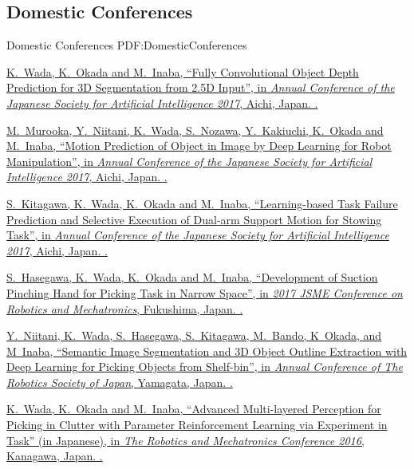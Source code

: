 \documentclass[letterpaper,MMMyyyy,nonstop]{simpleresumecv}
\begin{document}
\begin{body}
\BigGap
\subsection
{Domestic Conferences}
{Domestic Conferences}
{PDF:DomesticConferences}

\GapNoBreak
\NumberedItem{{\CharSpace}[10]}
\href{https://www.ai-gakkai.or.jp/jsai2017}
{\underline{K.~Wada}, K.~Okada and M.~Inaba,
``Fully Convolutional Object Depth Prediction for 3D Segmentation from 2.5D Input'',
in \textit{Annual Conference of the Japanese Society for Artificial Intelligence 2017},
Aichi, Japan.
.}

\GapNoBreak
\NumberedItem{{\CharSpace}[11]}
\href{https://www.ai-gakkai.or.jp/jsai2017}
{M.~Murooka, Y.~Niitani, \underline{K.~Wada}, S.~Nozawa, Y.~Kakiuchi, K.~Okada and M.~Inaba,
``Motion Prediction of Object in Image by Deep Learning for Robot Manipulation'',
in \textit{Annual Conference of the Japanese Society for Artificial Intelligence 2017},
Aichi, Japan.
.}

\GapNoBreak
\NumberedItem{{\CharSpace}[12]}
\href{https://www.ai-gakkai.or.jp/jsai2017}
{S.~Kitagawa, \underline{K.~Wada}, K.~Okada and M.~Inaba,
``Learning-based Task Failure Prediction and Selective Execution of Dual-arm Support Motion for Stowing Task'',
in \textit{Annual Conference of the Japanese Society for Artificial Intelligence 2017},
Aichi, Japan.
.}

\GapNoBreak
\NumberedItem{{\CharSpace}[13]}
\href{http://robomech.org/2017/en/}
{S.~Hasegawa, \underline{K.~Wada}, K.~Okada and M.~Inaba,
``Development of Suction Pinching Hand for Picking Task in Narrow Space'',
in \textit{2017 JSME Conference on Robotics and Mechatronics},
Fukushima, Japan.
.}

\GapNoBreak
\NumberedItem{{\CharSpace}[4]}
\href{http://rsj2016.rsj-web.org/}
{Y.~Niitani, \underline{K.~Wada}, S.~Hasegawa, S.~Kitagawa, M.~Bando, K~Okada, and M~Inaba,
``Semantic Image Segmentation and 3D Object Outline Extraction with Deep Learning for Picking Objects from Shelf-bin'',
in \textit{Annual Conference of The Robotics Society of Japan},
Yamagata, Japan.
.}

\GapNoBreak
\NumberedItem{{\CharSpace}[3]}
\href{http://robomech.org/2016/en/}
{\underline{K.~Wada}, K.~Okada and M.~Inaba,
``Advanced Multi-layered Perception for Picking in Clutter with Parameter Reinforcement Learning via Experiment in Task'' (in Japanese),
in \textit{The Robotics and Mechatronics Conference 2016},
Kanagawa, Japan.
.}


\end{body}
\end{document}
